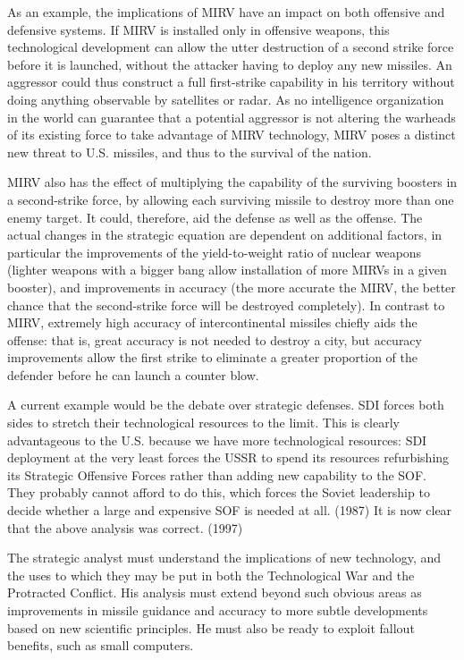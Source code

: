 As an example, the implications of MIRV have an impact on both offensive and defensive systems. If MIRV is installed only in offensive weapons, this technological development can allow the utter destruction of a second strike force before it is launched, without the attacker having to deploy any new missiles. An aggressor could thus construct a full first-strike capability in his territory without doing anything observable by satellites or radar. As no intelligence organization in the world can guarantee that a potential aggressor is not altering the warheads of its existing force to take advantage of MIRV technology, MIRV poses a distinct new threat to U.S. missiles, and thus to the survival of the nation.

MIRV also has the effect of multiplying the capability of the surviving boosters in a second-strike force, by allowing each surviving missile to destroy more than one enemy target. It could, therefore, aid the defense as well as the offense. The actual changes in the strategic equation are dependent on additional factors, in particular the improvements of the yield-to-weight ratio of nuclear weapons (lighter weapons with a bigger bang allow installation of more MIRVs in a given booster), and improvements in accuracy (the more accurate the MIRV, the better chance that the second-strike force will be destroyed completely). In contrast to MIRV, extremely high accuracy of intercontinental missiles chiefly aids the offense: that is, great accuracy is not needed to destroy a city, but accuracy improvements allow the first strike to eliminate a greater proportion of the defender before he can launch a counter blow.

\begin{mdframed}[backgroundcolor=black!10]
A current example would be the debate over strategic defenses. SDI forces both sides to stretch their technological resources to the limit. This is clearly advantageous to the U.S. because we have more technological resources: SDI deployment at the very least forces the USSR to spend its resources refurbishing its Strategic Offensive Forces rather than adding new capability to the SOF. They probably cannot afford to do this, which forces the Soviet leadership to decide whether a large and expensive SOF is needed at all. (1987)
It is now clear that the above analysis was correct. (1997)
\end{mdframed}

The strategic analyst must understand the implications of new technology, and the uses to which they may be put in both the Technological War and the Protracted Conflict. His analysis must extend beyond such obvious areas as improvements in missile guidance and accuracy to more subtle developments based on new scientific principles. He must also be ready to exploit fallout benefits, such as small computers.

